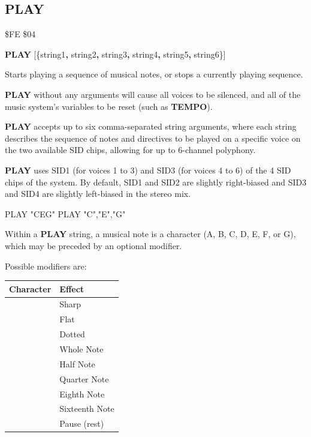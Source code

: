 \subsection{PLAY}
\begin{description}[leftmargin=2cm,style=nextline]
\item [Token:] \$FE \$04
\item [Format:] {\bf PLAY} [\{string1{\bf,} string2{\bf,} string3{\bf,}
		string4{\bf,} string5{\bf,} string6\}]
\item [Usage:] Starts playing a sequence of musical notes, or stops a currently playing sequence.

               {\bf PLAY} without any arguments will cause all voices to be silenced,
               and all of the music system's variables to be reset (such as {\bf TEMPO}).

               {\bf PLAY} accepts up to six comma-separated string arguments,
               where each string describes the sequence of notes and directives to be played on
               a specific voice on the two available SID chips, allowing for up to 6-channel polyphony.

               {\bf PLAY} uses SID1 (for voices 1 to 3) and SID3 (for voices 4 to 6)
               of the 4 SID chips of the system. By default, SID1 and SID2 are slightly
               right-biased and SID3 and SID4 are slightly left-biased in the stereo mix.

\begin{screencode}
PLAY "CEG"
PLAY "C","E","G"
\end{screencode}

               Within a {\bf PLAY} string, a musical note is a character (A, B, C, D, E, F, or G),
               which may be preceded by an optional modifier.

               Possible modifiers are:
\begin{center}
{\setlength{\tabcolsep}{1mm}
\begin{tabular}{*{1}{|c}|l|}
\hline
{\bf Character}  & {\bf Effect} \\
\hline
\screentext{\#} & Sharp \\
\screentext{\$} & Flat \\
  & Dotted \\
  & Whole Note \\
  & Half Note \\
  & Quarter Note \\
  & Eighth Note \\
  & Sixteenth Note \\
  & Pause (rest) \\
\hline
\end{tabular}
}
\end{center}


\end{description}
